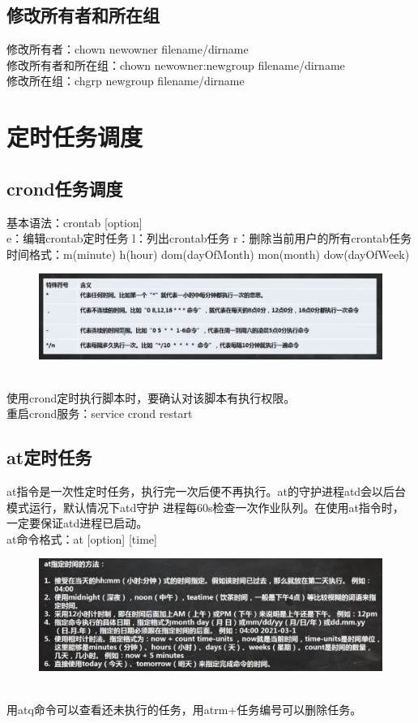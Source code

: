 \documentclass[11pt]{article}
\begin{document}
\subsection{修改所有者和所在组}
修改所有者：chown newowner filename/dirname \\
修改所有者和所在组：chown newowner:newgroup filename/dirname  \\
修改所在组：chgrp newgroup filename/dirname


\section{定时任务调度}

\subsection{crond任务调度}
基本语法：crontab [option]  \\
e：编辑crontab定时任务 \qquad l：列出crontab任务 \qquad r：删除当前用户的所有crontab任务 \\
时间格式：m(minute) h(hour) dom(dayOfMonth) mon(month) dow(dayOfWeek)  \\
\begin{figure}[htb]
    \centering
    \includegraphics[scale=0.3]{imgs/crontab.png}
\end{figure} \\
使用crond定时执行脚本时，要确认对该脚本有执行权限。  \\
重启crond服务：service crond restart

\subsection{at定时任务}
at指令是一次性定时任务，执行完一次后便不再执行。at的守护进程atd会以后台模式运行，默认情况下atd守护
进程每60s检查一次作业队列。在使用at指令时，一定要保证atd进程已启动。  \\
at命令格式：at [option] [time]  \\
\begin{figure}[htb]
    \centering
    \includegraphics[scale=0.27]{imgs/at_time.png}
\end{figure} \\
用atq命令可以查看还未执行的任务，用atrm+任务编号可以删除任务。
\end{document}
